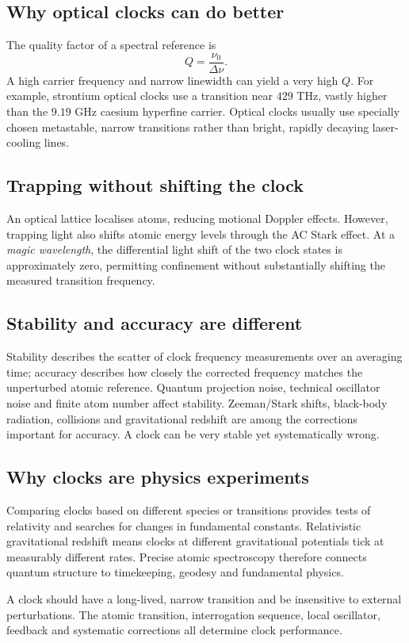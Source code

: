 \subsection{Why optical clocks can do better}
The quality factor of a spectral
reference is
\[
\boxed{Q=\frac{\nu_0}{\Delta\nu}}.
\]
A high carrier frequency and narrow
linewidth can yield a very high \(Q\).
For example, strontium optical clocks
use a transition near \(429\) THz,
vastly higher than the \(9.19\) GHz
caesium hyperfine carrier.
Optical clocks usually use specially
chosen metastable, narrow transitions
rather than bright, rapidly
decaying laser-cooling lines.

\subsection{Trapping without shifting the clock}
An optical lattice localises atoms,
reducing motional Doppler effects.
However, trapping light also shifts
atomic energy levels through the
AC Stark effect. At a
\emph{magic wavelength}, the
differential light shift of the
two clock states is approximately
zero, permitting confinement
without substantially shifting
the measured transition frequency.

\subsection{Stability and accuracy are different}
Stability describes the scatter
of clock frequency measurements
over an averaging time; accuracy
describes how closely the corrected
frequency matches the unperturbed
atomic reference. Quantum projection
noise, technical oscillator noise
and finite atom number affect
stability. Zeeman/Stark shifts,
black-body radiation, collisions
and gravitational redshift are
among the corrections important
for accuracy. A clock can be
very stable yet systematically wrong.

\subsection{Why clocks are physics experiments}
Comparing clocks based on different
species or transitions provides tests
of relativity and searches for
changes in fundamental constants.
Relativistic gravitational redshift
means clocks at different gravitational
potentials tick at measurably different
rates. Precise atomic spectroscopy
therefore connects quantum
structure to timekeeping, geodesy
and fundamental physics.

\begin{checkpoint}
A clock should have a long-lived,
narrow transition and be insensitive
to external perturbations.
The atomic transition, interrogation
sequence, local oscillator, feedback
and systematic corrections all
determine clock performance.
\end{checkpoint}
